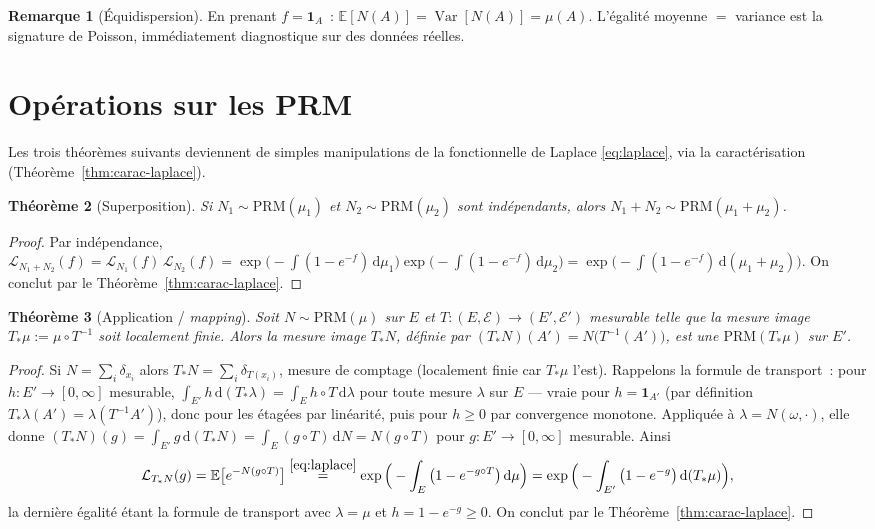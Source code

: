 \documentclass[11pt,a4paper]{article}
\theoremstyle{plain}
\newtheorem{theoreme}{Théorème}[section]
\theoremstyle{definition}
\newtheorem{remarque}[theoreme]{Remarque}
\newcommand{\E}{\mathbb{E}}
\newcommand{\Var}{\operatorname{Var}}
\newcommand{\one}{\mathbf{1}}
\newcommand{\dd}{\,\mathrm{d}}
\newcommand{\calE}{\mathcal{E}}
\newcommand{\calL}{\mathcal{L}}
\begin{document}
\begin{remarque}[Équidispersion]
En prenant $f=\one_A$~: $\E[N(A)]=\Var[N(A)]=\mu(A)$. L'égalité moyenne $=$ variance est la signature de Poisson, immédiatement diagnostique sur des données réelles.
\end{remarque}

\section{Opérations sur les PRM}

Les trois théorèmes suivants deviennent de simples manipulations de la fonctionnelle de Laplace \eqref{eq:laplace}, via la caractérisation (Théorème~\ref{thm:carac-laplace}).

\begin{theoreme}[Superposition]\label{thm:superpo}
Si $N_1\sim\mathrm{PRM}(\mu_1)$ et $N_2\sim\mathrm{PRM}(\mu_2)$ sont indépendants, alors $N_1+N_2\sim\mathrm{PRM}(\mu_1+\mu_2)$.
\end{theoreme}

\begin{proof}
Par indépendance, $\calL_{N_1+N_2}(f)=\calL_{N_1}(f)\,\calL_{N_2}(f)=\exp\big(-\int(1-e^{-f})\dd\mu_1\big)\exp\big(-\int(1-e^{-f})\dd\mu_2\big)=\exp\big(-\int(1-e^{-f})\dd(\mu_1+\mu_2)\big)$. On conclut par le Théorème~\ref{thm:carac-laplace}.
\end{proof}

\begin{theoreme}[Application / \emph{mapping}]\label{thm:mapping}
Soit $N\sim\mathrm{PRM}(\mu)$ sur $E$ et $T:(E,\calE)\to(E',\calE')$ mesurable telle que la mesure image $T_*\mu:=\mu\circ T^{-1}$ soit localement finie. Alors la mesure image $T_*N$, définie par $(T_*N)(A')=N\big(T^{-1}(A')\big)$, est une $\mathrm{PRM}(T_*\mu)$ sur $E'$.
\end{theoreme}

\begin{proof}
Si $N=\sum_i\delta_{x_i}$ alors $T_*N=\sum_i\delta_{T(x_i)}$, mesure de comptage (localement finie car $T_*\mu$ l'est). Rappelons la formule de transport~: pour $h:E'\to[0,\infty]$ mesurable, $\int_{E'}h\dd(T_*\lambda)=\int_E h\circ T\dd\lambda$ pour toute mesure $\lambda$ sur $E$ --- vraie pour $h=\one_{A'}$ (par définition $T_*\lambda(A')=\lambda(T^{-1}A')$), donc pour les étagées par linéarité, puis pour $h\ge0$ par convergence monotone. Appliquée à $\lambda=N(\omega,\cdot)$, elle donne $(T_*N)(g)=\int_{E'}g\dd(T_*N)=\int_E (g\circ T)\dd N=N(g\circ T)$ pour $g:E'\to[0,\infty]$ mesurable. Ainsi
\[
\calL_{T_*N}(g)=\E\big[e^{-N(g\circ T)}\big]
\overset{\eqref{eq:laplace}}{=}\exp\Big(-\int_E\big(1-e^{-g\circ T}\big)\dd\mu\Big)
=\exp\Big(-\int_{E'}\big(1-e^{-g}\big)\dd(T_*\mu)\Big),
\]
la dernière égalité étant la formule de transport avec $\lambda=\mu$ et $h=1-e^{-g}\ge0$. On conclut par le Théorème~\ref{thm:carac-laplace}.
\end{proof}
\end{document}
